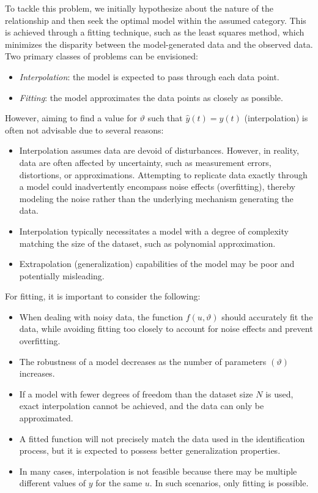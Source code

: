To tackle this problem, we initially hypothesize about the nature of the relationship and then seek the optimal model within the assumed category. 
This is achieved through a fitting technique, such as the least squares method, which minimizes the disparity between the model-generated data and the observed data.
Two primary classes of problems can be envisioned:
\begin{itemize}
    \item \textit{Interpolation}: the model is expected to pass through each data point.
    \item \textit{Fitting}: the model approximates the data points as closely as possible.
\end{itemize}
However, aiming to find a value for $\vartheta$ such that $\hat{y}(t) = y(t)$ (interpolation) is often not advisable due to several reasons:
\begin{itemize}
    \item Interpolation assumes data are devoid of disturbances.
        However, in reality, data are often affected by uncertainty, such as measurement errors, distortions, or approximations. 
            Attempting to replicate data exactly through a model could inadvertently encompass noise effects (overfitting), thereby modeling the noise rather than the underlying mechanism generating the data.
    \item Interpolation typically necessitates a model with a degree of complexity matching the size of the dataset, such as polynomial approximation.
    \item Extrapolation (generalization) capabilities of the model may be poor and potentially misleading.
\end{itemize}
For fitting, it is important to consider the following:
\begin{itemize}
    \item When dealing with noisy data, the function $f(u,\vartheta)$ should accurately fit the data, while avoiding fitting too closely to account for noise effects and prevent overfitting.
    \item The robustness of a model decreases as the number of parameters $(\vartheta)$ increases.
    \item If a model with fewer degrees of freedom than the dataset size $N$ is used, exact interpolation cannot be achieved, and the data can only be approximated.
    \item A fitted function will not precisely match the data used in the identification process, but it is expected to possess better generalization properties.
    \item In many cases, interpolation is not feasible because there may be multiple different values of $y$ for the same $u$. 
        In such scenarios, only fitting is possible.
\end{itemize}

